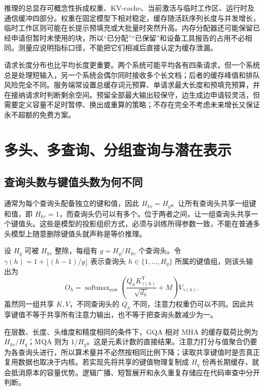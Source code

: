 \documentclass[UTF8,12pt,a4paper,fontset=fandol]{ctexart}
\begin{document}
推理的总显存可概念性拆成权重、KV-cache、当前激活与临时工作区、运行时及通信缓冲四部分。权重在固定模型下相对稳定，缓存随活跃序列长度与并发增长，临时工作区则可能在长提示预填充或大批量时突然升高。内存分配器还可能保留已经申请但暂时未使用的块，所以“已分配”“已保留”和设备工具报告的占用不必相同。测量应说明指标口径，不能把它们相减后直接认定为缓存泄漏。

请求长度分布也比平均长度更重要。两个系统可能平均各有四条请求，但一个系统总是处理短输入，另一个系统会偶尔同时接收多个长文档；后者的缓存峰值和排队风险完全不同。服务端常设置总缓存词元预算、单请求最大长度和预填充预算，并在接纳请求时判断剩余空间。预留全部最大输出较保守，边生成边申请较灵活，但需要定义容量不足时暂停、换出或重算的策略；不存在完全不考虑未来增长又保证永不超额的免费方案。

\section{多头、多查询、分组查询与潜在表示}
\label{sec:kv-heads}

\subsection{查询头数与键值头数为何不同}

通常为每个查询头配备独立的键和值，因此 $H_{kv}=H_q$。让所有查询头共享一组键和值，即 $H_{kv}=1$，而查询头仍可以有多个\cite{mqa}。位于两者之间，让一组查询头共享一个键值头\cite{gqa}。这些是模型的投影组织方式，必须与训练所得参数一致，不能在普通多头模型上随意删除键值头就声称是等价推理。

设 $H_q$ 可被 $H_{kv}$ 整除，每组有 $g=H_q/H_{kv}$ 个查询头。令 $\gamma(h)=1+\lfloor(h-1)/g\rfloor$ 表示查询头 $h\in\{1,\ldots,H_q\}$ 所属的键值组，则该头输出为
\begin{equation}
 O_h=\operatorname{softmax}_{\mathrm{row}}
 \left(\frac{Q_hK_{\gamma(h)}^{\mathsf T}}{\sqrt{d_h}}+M\right)
 V_{\gamma(h)}.
 \label{eq:kv-gqa}
\end{equation}
虽然同一组共享 $K,V$，不同查询头的 $Q_h$ 不同，注意力权重仍可以不同。因此共享键值不等于共享所有注意力输出，也不等于把查询头数减少为一。

在层数、长度、头维度和精度相同的条件下，GQA 相对 MHA 的缓存载荷比例为 $H_{kv}/H_q$；MQA 则为 $1/H_q$。这是元素计数的直接结果。注意力打分与值聚合仍要为各查询头进行，所以算术量并不必然按相同比例下降；读取共享键值时是否真正复用数据也取决于内核。若实现先将共享的键值物理复制成 $H_q$ 份再长期缓存，就会抵消原本的容量优势。逻辑广播、短暂展开和永久重复存储应在代码审查中分开判断。
\end{document}
